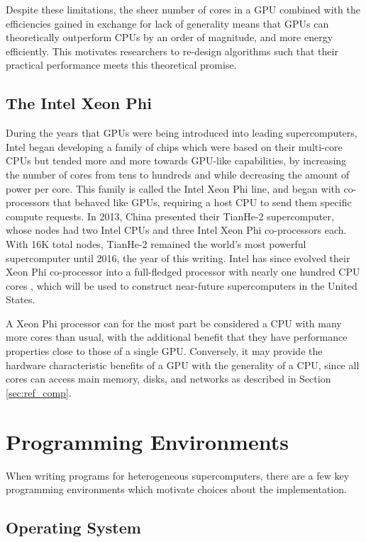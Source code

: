 Despite these limitations, the sheer number of cores in a GPU
combined with the efficiencies gained in exchange for lack of generality
means that GPUs can theoretically outperform CPUs by an order of
magnitude, and more energy efficiently.
This motivates researchers to re-design algorithms such that
their practical performance meets this theoretical promise.

\subsection{The Intel Xeon Phi}

During the years that GPUs were being introduced into leading supercomputers,
Intel began developing a family of chips which were based on
their multi-core CPUs but tended more and more towards GPU-like capabilities,
by increasing the number of cores from tens to hundreds and while decreasing
the amount of power per core.
This family is called the Intel Xeon Phi line, and began with co-processors
that behaved like GPUs, requiring a host CPU to send them specific compute
requests.
In 2013, China presented their TianHe-2 supercomputer, whose nodes had two Intel
CPUs and three Intel Xeon Phi co-processors each.
With 16K total nodes, TianHe-2 remained the world's most powerful supercomputer
until 2016, the year of this writing.
Intel has since evolved their Xeon Phi co-processor into a full-fledged
processor with nearly one hundred CPU cores \cite{jeffers2013intel},
which will be used to construct near-future supercomputers in the United States.

A Xeon Phi processor can for the most part be considered a CPU with
many more cores than usual, with the additional benefit that they have
performance properties close to those of a single GPU.
Conversely, it may provide the hardware characteristic benefits of a GPU
with the generality of a CPU, since all cores can access main memory,
disks, and networks as described in Section \ref{sec:ref_comp}.

\section{Programming Environments}

When writing programs for heterogeneous supercomputers,
there are a few key programming environments which motivate
choices about the implementation.

\subsection{Operating System}

